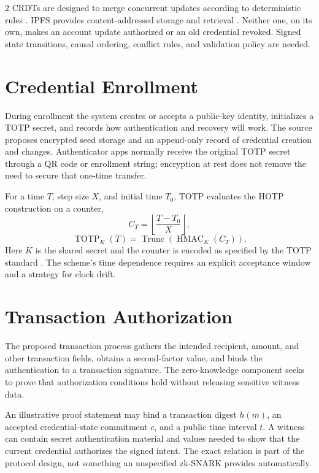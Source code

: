 \documentclass[10pt,letterpaper]{article}
\begin{document}
\begin{multicols}{2}
CRDTs are designed to merge concurrent updates according to deterministic rules \cite{shapiro}. IPFS provides content-addressed storage and retrieval \cite{ipfs}. Neither one, on its own, makes an account update authorized or an old credential revoked. Signed state transitions, causal ordering, conflict rules, and validation policy are needed.

\section{Credential Enrollment}
During enrollment the system creates or accepts a public-key identity, initializes a TOTP secret, and records how authentication and recovery will work. The source proposes encrypted seed storage and an append-only record of credential creation and changes. Authenticator apps normally receive the original TOTP secret through a QR code or enrollment string; encryption at rest does not remove the need to secure that one-time transfer.

For a time $T$, step size $X$, and initial time $T_0$, TOTP evaluates the HOTP construction on a counter,
\begin{equation}
 C_T=\left\lfloor\frac{T-T_0}{X}\right\rfloor,
\end{equation}
\begin{equation}
 \operatorname{TOTP}_K(T)=\operatorname{Trunc}(\operatorname{HMAC}_K(C_T)).
\end{equation}
Here $K$ is the shared secret and the counter is encoded as specified by the TOTP standard \cite{totp}. The scheme's time dependence requires an explicit acceptance window and a strategy for clock drift.

\section{Transaction Authorization}
The proposed transaction process gathers the intended recipient, amount, and other transaction fields, obtains a second-factor value, and binds the authentication to a transaction signature. The zero-knowledge component seeks to prove that authorization conditions hold without releasing sensitive witness data.

An illustrative proof statement may bind a transaction digest $h(m)$, an accepted credential-state commitment $c$, and a public time interval $t$. A witness can contain secret authentication material and values needed to show that the current credential authorizes the signed intent. The exact relation is part of the protocol design, not something an unspecified zk-SNARK provides automatically.


\end{multicols}
\end{document}
